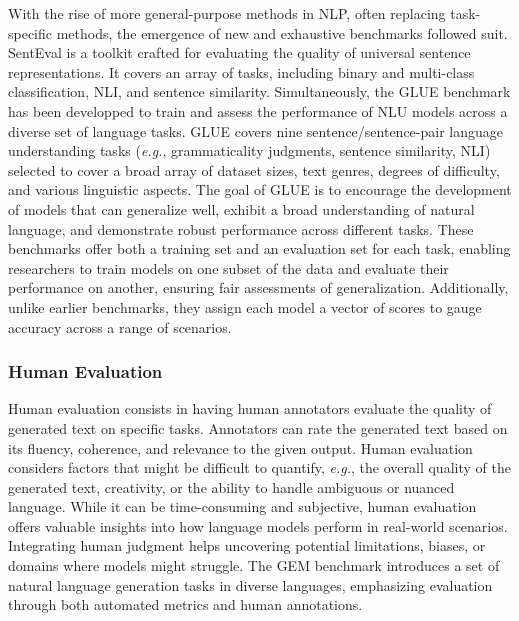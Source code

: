 With the rise of more general-purpose methods in \ac{NLP}, often replacing task-specific methods, the emergence of new and exhaustive benchmarks followed suit. SentEval \citep{conneau2018senteval} is a toolkit crafted for evaluating the quality of universal sentence representations. It covers an array of tasks, including binary and multi-class classification, \ac{NLI}, and sentence similarity. Simultaneously, the \ac{GLUE} benchmark has been developped to train and assess the performance of \ac{NLU} models across a diverse set of language tasks. \ac{GLUE} covers nine sentence/sentence-pair language understanding tasks (\textit{e.g.}, grammaticality judgments, sentence similarity, \ac{NLI}) selected to cover a broad array of dataset sizes, text genres, degrees of difficulty, and various linguistic aspects. The goal of \ac{GLUE} is to encourage the development of models that can generalize well, exhibit a broad understanding of natural language, and demonstrate robust performance across different tasks. 
These benchmarks offer both a training set and an evaluation set for each task, enabling researchers to train models on one subset of the data and evaluate their performance on another, ensuring fair assessments of generalization. Additionally, unlike earlier benchmarks, they assign each model a vector of scores to gauge accuracy across a range of scenarios.


\subsubsection{Human Evaluation} 

Human evaluation consists in having human annotators evaluate the quality of generated text on specific tasks. Annotators can rate the generated text based on its fluency, coherence, and relevance to the given output. Human evaluation considers factors that might be difficult to quantify, \textit{e.g.}, the overall quality of the generated text, creativity, or the ability to handle ambiguous or nuanced language. While it can be time-consuming and subjective, human evaluation offers valuable insights into how language models perform in real-world scenarios. Integrating human judgment helps uncovering potential limitations, biases, or domains where models might struggle. The \ac{GEM} benchmark \citep{gehrmann2021gem} introduces a set of natural language generation tasks in diverse languages, emphasizing evaluation through both automated metrics and human annotations. 



